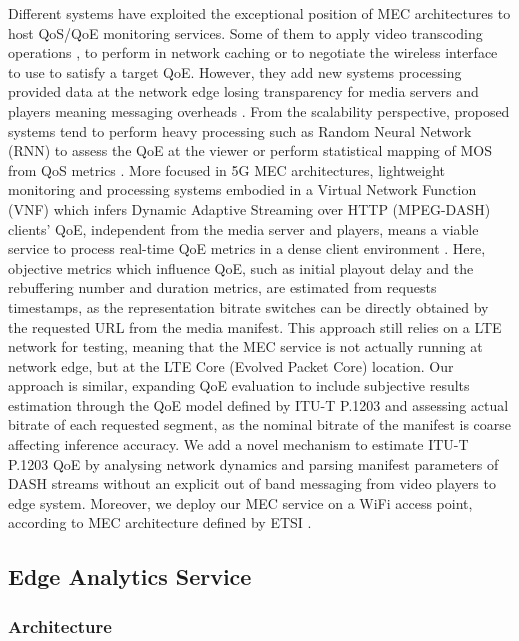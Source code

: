 Different systems have exploited the exceptional position of MEC architectures to host QoS/QoE monitoring services. Some of them to apply video transcoding operations \cite{Dutta2016}, to perform in network caching \cite{younis2019} or to negotiate the wireless interface to use \cite{zhang2018} to satisfy a target QoE. However, they add new systems processing provided data at the network edge losing transparency for media servers and players meaning messaging overheads \cite{Dutta2016}. From the scalability perspective, proposed systems tend to perform heavy processing such as Random Neural Network (RNN) to assess the QoE at the viewer \cite{Dutta2016} or perform statistical mapping of MOS from QoS metrics \cite{zhang2018}. More focused in 5G MEC architectures, lightweight monitoring and processing systems embodied in a Virtual Network Function (VNF) which infers Dynamic Adaptive Streaming over HTTP (MPEG-DASH) clients’ QoE, independent from the media server and players, means a viable service to process real-time QoE metrics in a dense client environment \cite{ge2018}.
Here, objective metrics which influence QoE, such as initial playout delay and the rebuffering number and duration metrics, are estimated from requests timestamps, as the representation bitrate switches can be directly obtained by the requested URL from the media manifest. This approach still relies on a LTE network for testing, meaning that the MEC service is not actually running at network edge, but at the LTE Core (Evolved Packet Core) location. Our approach is similar, expanding QoE evaluation to include subjective results estimation through the QoE model defined by ITU-T P.1203 \cite{itup1203} and assessing actual bitrate of each requested segment, as the nominal bitrate of the manifest is coarse affecting inference accuracy.
We add a novel mechanism to estimate ITU-T P.1203 QoE by analysing network dynamics and parsing manifest parameters of DASH streams without an explicit out of band messaging from video players to edge system.
Moreover, we deploy our MEC service on a WiFi access point, according to MEC architecture defined by ETSI \cite{etsigsmecwifi}.

\subsection{Edge Analytics Service}
\label{sec:MTAP20203}
\subsubsection{Architecture}
\label{sec:MTAP202031}

